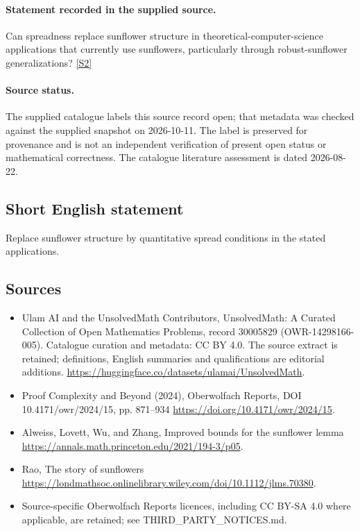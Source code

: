 \documentclass[11pt]{article}
\begin{document}
\paragraph{Statement recorded in the supplied source.}
Can spreadness replace sunflower structure in theoretical-computer-science applications that currently use sunflowers, particularly through robust-sunflower generalizations? \href{https://doi.org/10.4171/owr/2024/15}{[S2]}
\paragraph{Source status.}
The supplied catalogue labels this source record open; that metadata was checked against the supplied snapshot on 2026-10-11. The label is preserved for provenance and is not an independent verification of present open status or mathematical correctness. The catalogue literature assessment is dated 2026-08-22.
\subsection{Short English statement}
Replace sunflower structure by quantitative spread conditions in the stated applications.
\subsection{Sources}
\begin{itemize}
\item[S1] Ulam AI and the UnsolvedMath Contributors, UnsolvedMath: A Curated Collection of Open Mathematics Problems, record 30005829 (OWR-14298166-005). Catalogue curation and metadata: CC BY 4.0. The source extract is retained; definitions, English summaries and qualifications are editorial additions.
\url{https://huggingface.co/datasets/ulamai/UnsolvedMath}.
\item[S2] Proof Complexity and Beyond (2024), Oberwolfach Reports, DOI 10.4171/owr/2024/15, pp. 871--934
\url{https://doi.org/10.4171/owr/2024/15}.
\item[S3] Alweiss, Lovett, Wu, and Zhang, Improved bounds for the sunflower lemma
\url{https://annals.math.princeton.edu/2021/194-3/p05}.
\item[S4] Rao, The story of sunflowers
\url{https://londmathsoc.onlinelibrary.wiley.com/doi/10.1112/jlms.70380}.
\item Source-specific Oberwolfach Reports licences, including CC BY-SA 4.0 where applicable, are retained; see THIRD\_PARTY\_NOTICES.md.
\end{itemize}
\end{document}
